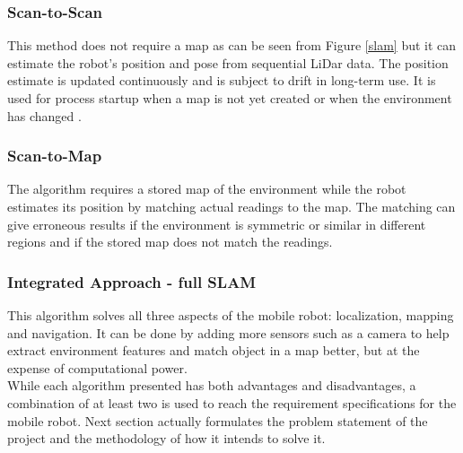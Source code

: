 \subsubsection{Scan-to-Scan}
This method does not require a map as can be seen from Figure \ref{slam} but it can estimate the robot's position and pose from sequential LiDar data. The position estimate is updated continuously and is subject to drift in long-term use. It is used for process startup when a map is not yet created or when the environment has changed \cite{agv}.\\

\subsubsection{Scan-to-Map}
The algorithm requires a stored map of the environment while the robot estimates its position by matching actual readings to the map. The matching can give erroneous results if the environment is symmetric or similar in different regions and if the stored map does not match the readings.\\

\subsubsection{Integrated Approach - full SLAM}
This algorithm solves all three aspects of the mobile robot: localization, mapping and navigation. It can be done by adding more sensors such as a camera to help extract environment features and match object in a map better, but at the expense of computational power.\\

While each algorithm presented has both advantages and disadvantages, a combination of at least two is used to reach the requirement specifications for the mobile robot. Next section actually formulates the problem statement of the project and the methodology of how it intends to solve it.\\ 




